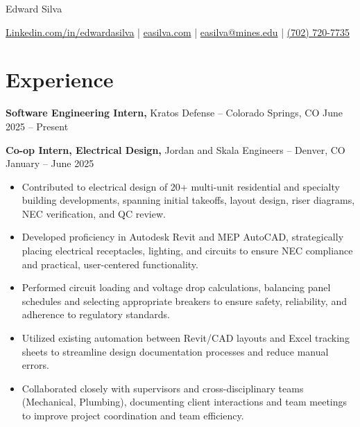 \documentclass[11pt]{article}       %
\begin{document}
\centerline{\huge Edward Silva}
\vspace{5pt}

\centerline{
\href{https://www.linkedin.com/in/edwardasilva/}{Linkedin.com/in/edwardasilva}
| \href{https://easilva.com}{easilva.com}
| \href{mailto:easilva@mines.edu}{easilva@mines.edu} 
| \href{tel:7027207735}{(702) 720-7735}
}

\vspace{-14pt}
\section*{Experience}
\vspace{5pt}
\textbf{Software Engineering Intern, }{Kratos Defense} -- Colorado Springs, CO \hfill June 2025 -- Present \\
\vspace{5pt}

\textbf{Co-op Intern, Electrical Design, }{Jordan and Skala Engineers} -- Denver, CO \hfill January -- June 2025 \\
\vspace{-6.5pt}
\begin{itemize}
  \item Contributed to electrical design of 20+ multi-unit residential and specialty building developments, spanning initial takeoffs, layout design, riser diagrams, NEC verification, and QC review.
  \item Developed proficiency in Autodesk Revit and MEP AutoCAD, strategically placing electrical receptacles, lighting, and circuits to ensure NEC compliance and practical, user-centered functionality.
  \item Performed circuit loading and voltage drop calculations, balancing panel schedules and selecting appropriate breakers to ensure safety, reliability, and adherence to regulatory standards.
  \item Utilized existing automation between Revit/CAD layouts and Excel tracking sheets to streamline design documentation processes and reduce manual errors.
  \item Collaborated closely with supervisors and cross-disciplinary teams (Mechanical, Plumbing), documenting client interactions and team meetings to improve project coordination and team efficiency.
\end{itemize}
\end{document}
